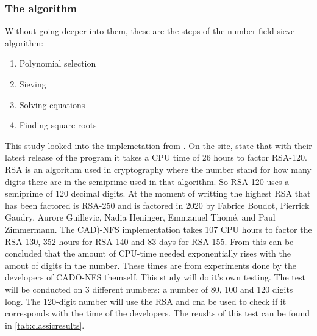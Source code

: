 \subsubsection{The algorithm}
Without going deeper into them, these are the steps of the number field sieve algorithm:
\begin{enumerate}
    \item Polynomial selection
    \item Sieving
    \item Solving equations
    \item Finding square roots
\end{enumerate}
This study looked into the implemetation from \textcite{cadoNFS}.
On the site, \textcite{cadoNFS} state that with their latest release of the program it takes a CPU time of 26 hours to factor RSA-120. RSA is an algorithm used in cryptography where the number stand for how many digits there are in the semiprime used in that algorithm.
So RSA-120 uses a semiprime of 120 decimal digits. At the moment of writting the highest RSA that has been factored is RSA-250 and is factored in 2020 by Fabrice Boudot, Pierrick Gaudry, Aurore Guillevic, Nadia Heninger, Emmanuel Thomé, and Paul Zimmermann.
The CAD)-NFS implementation takes 107 CPU hours to factor the RSA-130, 352 hours for RSA-140 and 83 days for RSA-155. From this can be concluded that the amount of CPU-time needed exponentially rises with the amout of digits in the number.
These times are from experiments done by the developers of CADO-NFS themself. This study will do it's own testing.
The test will be conducted on 3 different numbers: a number of 80, 100 and 120 digits long. The 120-digit number will use the RSA and cna be used to check if it corresponds with the time of the developers.
The reuslts of this test can be found in \ref{tab:classicresults}.


